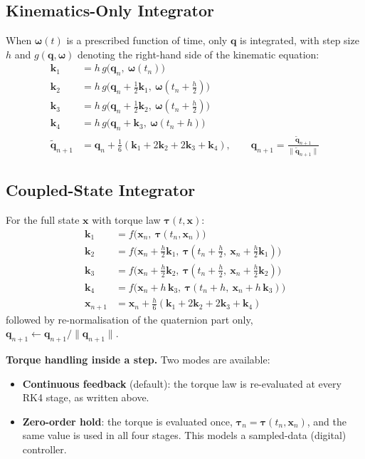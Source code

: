 \documentclass[11pt, a4paper]{article}
\newcommand{\vect}[1]{\boldsymbol{#1}}
\newcommand{\w}{\vect{\omega}}
\begin{document}
\subsection{Kinematics-Only Integrator}
When $\w(t)$ is a prescribed function of time, only $\vect{q}$ is integrated, with step size $h$ and $g(\vect{q}, \w)$ denoting the right-hand side of the kinematic equation:
\begin{align}
\vect{k}_1 &= h\, g\big(\vect{q}_n,\ \w(t_n)\big) \\
\vect{k}_2 &= h\, g\big(\vect{q}_n + \tfrac{1}{2}\vect{k}_1,\ \w(t_n + \tfrac{h}{2})\big) \\
\vect{k}_3 &= h\, g\big(\vect{q}_n + \tfrac{1}{2}\vect{k}_2,\ \w(t_n + \tfrac{h}{2})\big) \\
\vect{k}_4 &= h\, g\big(\vect{q}_n + \vect{k}_3,\ \w(t_n + h)\big) \\
\tilde{\vect{q}}_{n+1} &= \vect{q}_n + \tfrac{1}{6} \left( \vect{k}_1 + 2\vect{k}_2 + 2\vect{k}_3 + \vect{k}_4 \right),
\qquad
\vect{q}_{n+1} = \frac{\tilde{\vect{q}}_{n+1}}{\lVert \tilde{\vect{q}}_{n+1} \rVert}
\end{align}

\subsection{Coupled-State Integrator}
For the full state $\vect{x}$ with torque law $\vect{\tau}(t, \vect{x})$:
\begin{align}
\vect{k}_1 &= f\big(\vect{x}_n,\ \vect{\tau}(t_n, \vect{x}_n)\big) \\
\vect{k}_2 &= f\big(\vect{x}_n + \tfrac{h}{2}\vect{k}_1,\ \vect{\tau}(t_n + \tfrac{h}{2},\ \vect{x}_n + \tfrac{h}{2}\vect{k}_1)\big) \\
\vect{k}_3 &= f\big(\vect{x}_n + \tfrac{h}{2}\vect{k}_2,\ \vect{\tau}(t_n + \tfrac{h}{2},\ \vect{x}_n + \tfrac{h}{2}\vect{k}_2)\big) \\
\vect{k}_4 &= f\big(\vect{x}_n + h\,\vect{k}_3,\ \vect{\tau}(t_n + h,\ \vect{x}_n + h\,\vect{k}_3)\big) \\
\vect{x}_{n+1} &= \vect{x}_n + \frac{h}{6} \left( \vect{k}_1 + 2\vect{k}_2 + 2\vect{k}_3 + \vect{k}_4 \right)
\end{align}
followed by re-normalisation of the quaternion part only, $\vect{q}_{n+1} \leftarrow \vect{q}_{n+1} / \lVert \vect{q}_{n+1} \rVert$.

\textbf{Torque handling inside a step.} Two modes are available:
\begin{itemize}
    \item \textbf{Continuous feedback} (default): the torque law is re-evaluated at every RK4 stage, as written above.
    \item \textbf{Zero-order hold}: the torque is evaluated once, $\vect{\tau}_n = \vect{\tau}(t_n, \vect{x}_n)$, and the same value is used in all four stages. This models a sampled-data (digital) controller.
\end{itemize}
\end{document}
